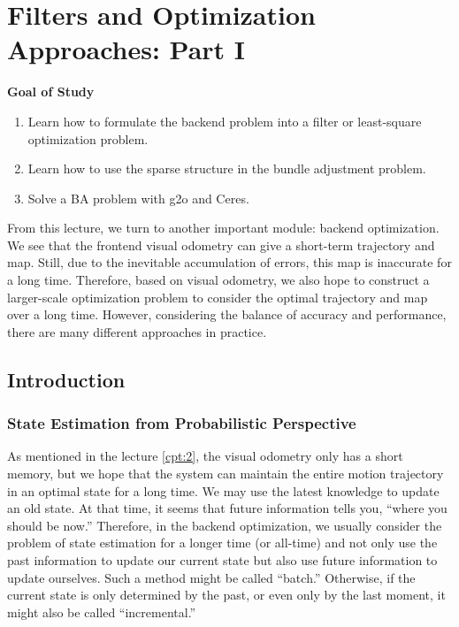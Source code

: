 \chapter{Filters and Optimization Approaches: Part I}
\label{cpt:backend1}
\label{cpt:9}
\begin{mdframed}  
	\textbf{Goal of Study}
	\begin{enumerate}[labelindent=0em,leftmargin=1.5em]
		\item Learn how to formulate the backend problem into a filter or least-square optimization problem.
		\item Learn how to use the sparse structure in the bundle adjustment problem. 
		\item Solve a BA problem with g2o and Ceres.
	\end{enumerate}
\end{mdframed}

From this lecture, we turn to another important module: backend optimization.
We see that the frontend visual odometry can give a short-term trajectory and map. Still, due to the inevitable accumulation of errors, this map is inaccurate for a long time. Therefore, based on visual odometry, we also hope to construct a larger-scale optimization problem to consider the optimal trajectory and map over a long time. However, considering the balance of accuracy and performance, there are many different approaches in practice.

\newpage


\newpage
\section{Introduction}
\subsection{State Estimation from Probabilistic Perspective}
As mentioned in the lecture \ref{cpt:2}, the visual odometry only has a short memory, but we hope that the system can maintain the entire motion trajectory in an optimal state for a long time. We may use the latest knowledge to update an old state. At that time, it seems that future information tells you, ``where you should be now.'' Therefore, in the backend optimization, we usually consider the problem of state estimation for a longer time (or all-time) and not only use the past information to update our current state but also use future information to update ourselves. Such a method might be called ``batch.'' Otherwise, if the current state is only determined by the past, or even only by the last moment, it might also be called ``incremental.''

